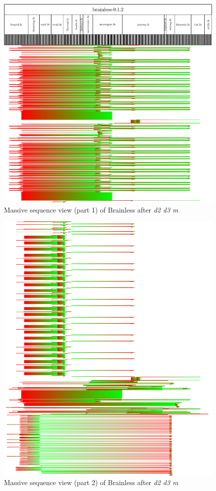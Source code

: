 \begin{figure}[p]
    \centering
    \includegraphics[scale=0.52]{graphics/massive_sequence_view-dir_file_word_1.png}
    \caption{Massive sequence view (part 1) of Brainless after \emph{d2 d3 m}}
    \label{fig:massive_sequence_view_1}
\end{figure}

\begin{figure}[p]
    \centering
    \includegraphics[scale=0.52]{graphics/massive_sequence_view-dir_file_word_2.png}
    \caption{Massive sequence view (part 2) of Brainless after \emph{d2 d3 m}}
    \label{fig:massive_sequence_view_2}
\end{figure}

